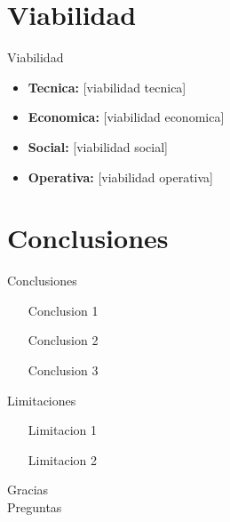 \documentclass[aspectratio=169]{beamer}
\begin{document}
\section{Viabilidad}

\begin{frame}{Viabilidad}
    \begin{itemize}
        \item \textbf{Tecnica:} [viabilidad tecnica]
        \item \textbf{Economica:} [viabilidad economica]
        \item \textbf{Social:} [viabilidad social]
        \item \textbf{Operativa:} [viabilidad operativa]
    \end{itemize}
\end{frame}

\section{Conclusiones}

\begin{frame}{Conclusiones}
    \begin{itemize}
        \item [Conclusion 1]
        \item [Conclusion 2]
        \item [Conclusion 3]
    \end{itemize}
\end{frame}

\begin{frame}{Limitaciones}
    \begin{itemize}
        \item [Limitacion 1]
        \item [Limitacion 2]
    \end{itemize}
\end{frame}

\begin{frame}[standout]
    Gracias \\[0.5cm]
    Preguntas
\end{frame}
\end{document}
